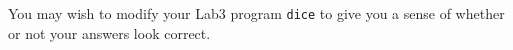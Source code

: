 \documentclass[10pt]{article}
\newenvironment{problem}[2][Problem]{\begin{trivlist}
\item[\hskip \labelsep {\bfseries #1}\hskip \labelsep {\bfseries #2.}]}{\end{trivlist}}
\begin{document}
\begin{problem}{1}
\begin{enumerate}[label=(\alph*)]
\end{enumerate}

You may wish to modify your Lab3 program {\tt dice} to give you a
sense of whether or not your answers look correct.
\end{problem}
\end{document}

